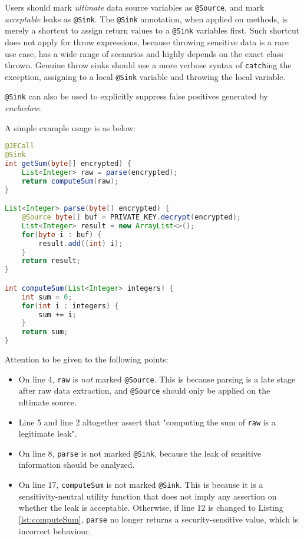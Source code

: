 \documentclass[a4paper, 12pt]{article}
\def\pname{\emph{enclavlow}}
\def\code#1{\colorbox{code}{\texttt{\footnotesize #1}}}
\begin{document}
Users should mark \emph{ultimate} data source variables as \code{@Source},
and mark \emph{acceptable} leaks as \code{@Sink}.
The \code{@Sink} annotation, when applied on methods,
is merely a shortcut to assign return values to a \code{@Sink} variables first.
Such shortcut does not apply for throw expressions,
because throwing sensitive data is a rare use case,
has a wide range of scenarios
and highly depends on the exact class thrown.
Genuine throw sinks should use a more verbose syntax of \code{catch}ing the exception,
assigning to a local \code{@Sink} variable and throwing the local variable.

\code{@Sink} can also be used to explicitly suppress false positives generated by \pname{}.

A simple example usage is as below:

\begin{lstlisting}[style=j, language=java, label={lst:SourceSinkExample},
caption={Simple example of @Source and @Sink}]
@JECall
@Sink
int getSum(byte[] encrypted) {
	List<Integer> raw = parse(encrypted);
	return computeSum(raw);
}

List<Integer> parse(byte[] encrypted) {
	@Source byte[] buf = PRIVATE_KEY.decrypt(encrypted);
	List<Integer> result = new ArrayList<>();
	for(byte i : buf) {
		result.add((int) i);
	}
	return result;
}

int computeSum(List<Integer> integers) {
	int sum = 0;
	for(int i : integers) {
		sum += i;
	}
	return sum;
}
\end{lstlisting}

Attention to be given to the following points:
\begin{itemize}
	\item On line 4, \code{raw} is \emph{not} marked \code{@Source}.
		This is because parsing is a late stage after raw data extraction,
		and \code{@Source} should only be applied on the ultimate source.
	\item Line 5 and line 2 altogether assert that
		"computing the sum of \code{raw} is a legitimate leak".
	\item On line 8, \code{parse} is not marked \code{@Sink},
		because the leak of sensitive information should be analyzed.
	\item On line 17, \code{computeSum} is not marked \code{@Sink}.
		This is because it is a sensitivity-neutral utility function
		that does not imply any assertion on whether the leak is acceptable.
		Otherwise, if line 12 is changed to Listing \ref{lst:computeSum},
		\code{parse} no longer returns a security-sensitive value,
		which is incorrect behaviour.
\end{itemize}
\end{document}
